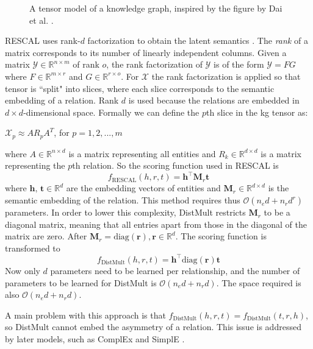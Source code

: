 \begin{figure}[htp]
    \centering
    
    \caption[A tensor model of a knowledge graph.]{A tensor model of a knowledge graph, inspired by the figure by Dai et al. \cite{dai2020survey}.}
    \label{tensor_model_fig}
\end{figure}

RESCAL uses rank-$d$ factorization to obtain the latent semantics \cite{RESCAL}. The \textit{rank} of a matrix corresponds to its number of linearly independent columns. Given a matrix $\mathcal{Y} \in \mathbb{R}^{n\times m}$ of rank $o$, the rank factorization of $\mathcal{Y}$ is of the form $\mathcal{Y}=FG$ where $F\in \mathbb{R}^{m\times r}$ and $G\in \mathbb{R}^{r\times o}$. For $\mathcal{X}$ the rank factorization is applied so that tensor is ``split" into slices, where each slice corresponds to the semantic embedding of a relation. Rank $d$ is used because the relations are embedded in $d \times d$-dimensional space. Formally we can define the $p$th slice in the \gls{kg} tensor as:
\begin{center}
 $\mathcal{X}_p \approx AR_p A^T$, for $p = 1,2,...,m$
\end{center}
where $A\in \mathbb{R}^{n\times d}$ is a matrix representing all entities and $R_k\in \mathbb{R}^{d\times d}$ is a matrix representing the $p$th relation.
So the scoring function used in RESCAL is
\[f_ {\text{RESCAL}}(h, r, t) =\textbf{h}^{\top}\textbf{M}_r\textbf{t}\]
where $\textbf{h, t}\in \mathbb{R}^{d}$ are the embedding vectors of entities and $\textbf{M}_r \in \mathbb{R}^{d\times d}$ is the semantic embedding of the relation.
This method requires thus $\mathcal{O}(n_ed + n_r d^r)$ parameters. In order to lower this complexity, DistMult restricts $\textbf{M}_r$ to be a diagonal matrix, meaning that all entries apart from those in the diagonal of the matrix are zero. After $\textbf{M}_r = \text{diag}(\textbf{r}), \textbf{r}\in\mathbb{R}^d$. The scoring function is transformed to
\[f_ {\text{DistMult}}(h, r, t) =\textbf{h}^{\top}\text{diag}(\textbf{r})\textbf{t}\]
Now only $d$ parameters need to be learned per relationship, and the number of parameters to be learned for DistMult is $\mathcal{O}(n_ed + n_r d)$. The space required is also $\mathcal{O}(n_ed + n_r d)$.

A main problem with this approach is that $f_ {\text{DistMult}}(h, r, t) = f_ {\text{DistMult}}(t, r, h)$, so DistMult cannot embed the asymmetry of a relation. This issue is addressed by later models, such as ComplEx \cite{complEx} and SimplE \cite{SimplE}.


